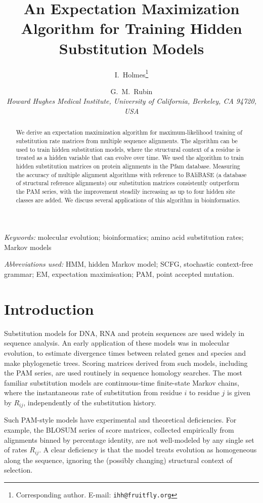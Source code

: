 \documentclass[12pt]{article}
\title{An Expectation Maximization Algorithm for Training Hidden Substitution Models}
\author{I.~Holmes\thanks{Corresponding author. E-mail: \texttt{ihh@fruitfly.org}} \and G.~M.~Rubin\\[6pt]
\textit{Howard Hughes Medical Institute, University of California, Berkeley, CA 94720, USA}}
\date{}
\begin{document}
\maketitle

\begin{abstract}
We derive an expectation maximization algorithm for maximum-likelihood training of substitution rate matrices from multiple sequence alignments. The algorithm can be used to train hidden substitution models, where the structural context of a residue is treated as a hidden variable that can evolve over time. We used the algorithm to train hidden substitution matrices on protein alignments in the Pfam database. Measuring the accuracy of multiple alignment algorithms with reference to BAliBASE (a database of structural reference alignments) our substitution matrices consistently outperform the PAM series, with the improvement steadily increasing as up to four hidden site classes are added. We discuss several applications of this algorithm in bioinformatics.
\end{abstract}

\noindent\textit{Keywords:} molecular evolution; bioinformatics; amino acid substitution rates; Markov models

\bigskip\noindent
\textit{Abbreviations used:} HMM, hidden Markov model; SCFG, stochastic context-free grammar; EM, expectation maximisation; PAM, point accepted mutation.


\section{Introduction}

Substitution models for DNA, RNA and protein sequences are used widely in sequence analysis.
An early application of these models was in molecular evolution, to estimate divergence times
between related genes and species and make phylogenetic trees.\cite{Felsenstein1981}
Scoring matrices derived from such models, including the PAM series,\cite{Dayhoff1978} are used
routinely in sequence homology searches. The most familiar substitution models are continuous-time
finite-state Markov chains,\cite{Karlin1975} where the instantaneous rate of substitution from
residue $i$ to residue $j$ is given by $R_{ij}$, independently of the substitution history.

Such PAM-style models have experimental and theoretical deficiencies. For example, the BLOSUM
series of score matrices, collected empirically from alignments binned by percentage identity,\cite{Henikoff1992}
are not well-modeled by any single set of rates $R_{ij}$.\cite{Durbin1998}
A clear deficiency is that the model treats evolution as homogeneous along the sequence, ignoring the
(possibly changing) structural context of selection.
\end{document}
